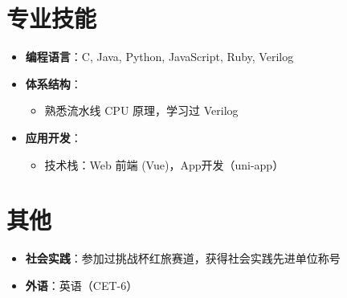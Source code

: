\documentclass{resume}
\begin{document}
\section{专业技能}
\begin{itemize}
  \item \textbf{编程语言}：C, Java, Python, JavaScript, Ruby, Verilog


  \item \textbf{体系结构}：
    \begin{itemize}
      \item 熟悉流水线 CPU 原理，学习过 Verilog
    \end{itemize}

  \item \textbf{应用开发}：
    \begin{itemize}
      \item 技术栈：Web 前端 (Vue)，App开发（uni-app）
    \end{itemize}

\end{itemize}

\section{其他}
\begin{itemize}
  \item \textbf{社会实践}：参加过挑战杯红旅赛道，获得社会实践先进单位称号
  \item \textbf{外语}：英语（CET-6）
\end{itemize}
\end{document}
